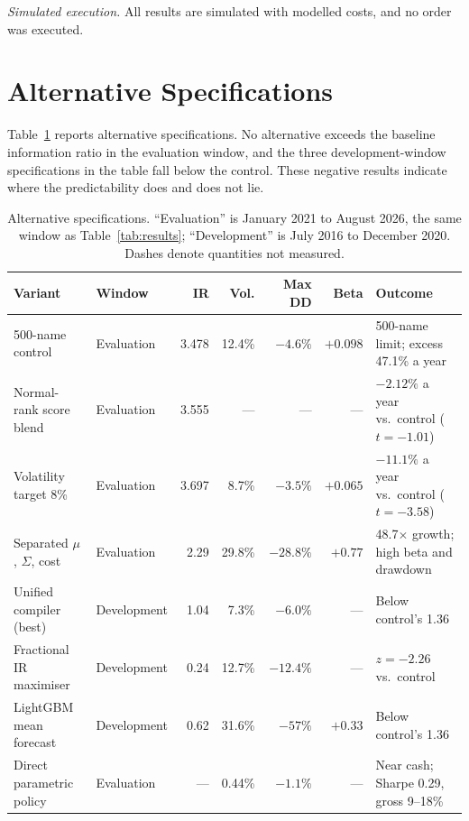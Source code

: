 \documentclass[10pt,twocolumn,letterpaper]{article}
\begin{document}
\textit{Simulated execution.} All results are simulated with modelled costs, and no order was executed.

\section{Alternative Specifications}

Table~\ref{tab:extensions} reports alternative specifications. No alternative exceeds the baseline information ratio in the evaluation window, and the three development-window specifications in the table fall below the control. These negative results indicate where the predictability does and does not lie.

\begin{table}[t]
\centering
\caption{Alternative specifications. ``Evaluation'' is January 2021 to August 2026, the same window as Table~\ref{tab:results}; ``Development'' is July 2016 to December 2020. Dashes denote quantities not measured.}
\label{tab:extensions}
\footnotesize
\setlength{\tabcolsep}{4pt}
\begin{tabular}{llrrrrl}
\toprule
Variant & Window & IR & Vol. & Max DD & Beta & Outcome \\
\midrule
500-name control & Evaluation & 3.478 & 12.4\% & $-4.6\%$ & $+0.098$ & 500-name limit; excess 47.1\% a year \\
Normal-rank score blend & Evaluation & 3.555 & --- & --- & --- & $-2.12\%$ a year vs.\ control ($t = -1.01$) \\
Volatility target 8\% & Evaluation & 3.697 & 8.7\% & $-3.5\%$ & $+0.065$ & $-11.1\%$ a year vs.\ control ($t = -3.58$) \\
Separated $\mu$, $\Sigma$, cost & Evaluation & 2.29 & 29.8\% & $-28.8\%$ & $+0.77$ & 48.7$\times$ growth; high beta and drawdown \\
Unified compiler (best) & Development & 1.04 & 7.3\% & $-6.0\%$ & --- & Below control's 1.36 \\
Fractional IR maximiser & Development & 0.24 & 12.7\% & $-12.4\%$ & --- & $z = -2.26$ vs.\ control \\
LightGBM mean forecast & Development & 0.62 & 31.6\% & $-57\%$ & $+0.33$ & Below control's 1.36 \\
Direct parametric policy & Evaluation & --- & 0.44\% & $-1.1\%$ & --- & Near cash; Sharpe 0.29, gross 9--18\% \\
\bottomrule
\end{tabular}
\end{table}
\end{document}
